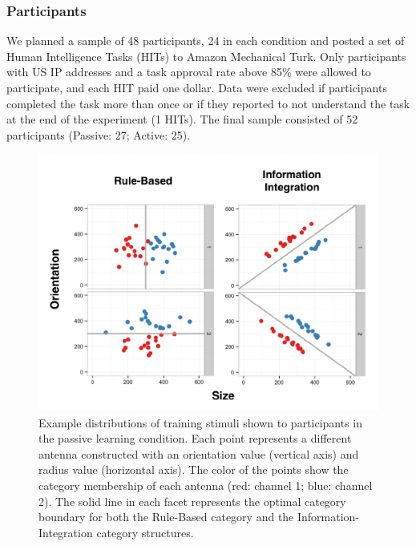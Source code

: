 \documentclass[10pt, letterpaper]{article}
\newenvironment{CodeChunk}{}{}
\begin{document}
\subsubsection{Participants}\label{participants}

We planned a sample of 48 participants, 24 in each condition and posted
a set of Human Intelligence Tasks (HITs) to Amazon Mechanical Turk. Only
participants with US IP addresses and a task approval rate above 85\%
were allowed to participate, and each HIT paid one dollar. Data were
excluded if participants completed the task more than once or if they
reported to not understand the task at the end of the experiment (1
HITs). The final sample consisted of 52 participants (Passive: 27;
Active: 25).

\begin{CodeChunk}
\begin{figure}[t]

{\centering \includegraphics{figs/category_exp1-1} 

}

\caption[Example distributions of training stimuli shown to participants in the passive learning condition]{Example distributions of training stimuli shown to participants in the passive learning condition. Each point represents a different antenna constructed with an orientation value (vertical axis) and radius value (horizontal axis). The color of the points show the category membership of each antenna (red: channel 1; blue: channel 2). The solid line in each facet represents the optimal category boundary for both the Rule-Based category and the Information-Integration category structures.}\label{fig:category_exp1}
\end{figure}
\end{CodeChunk}
\end{document}
